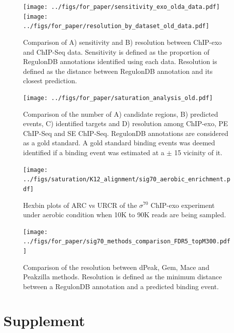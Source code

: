 \documentclass{bmcart}\usepackage[]{graphicx}\usepackage[]{color}
\newcommand{\beginsupplement}{%
        \setcounter{table}{0}
        \renewcommand{\thetable}{S\arabic{table}}%
        \setcounter{figure}{0}
        \renewcommand{\thefigure}{S\arabic{figure}}%
     }
\newcommand{\sig}{\sigma^{70}}
\begin{document}
\newpage
\begin{figure}[h!]
  \centering
  \texttt{[image: ../figs/for\_paper/sensitivity\_exo\_olda\_data.pdf]}
  \texttt{[image: ../figs/for\_paper/resolution\_by\_dataset\_old\_data.pdf]}
  \caption{Comparison of A) sensitivity and B) resolution between
    ChIP-exo and ChIP-Seq data. Sensitivity is defined as the
    proportion of RegulonDB annotations identified using each
    data. Resolution is defined as the distance between RegulonDB
    annotation and its closest prediction.}
  \label{fig:reso_all}
\end{figure}

\newpage

\begin{figure}[h]
  \centering
  \texttt{[image: ../figs/for\_paper/saturation\_analysis\_old.pdf]}
  \caption{Comparison of the number of A) candidate regions, B)
    predicted events, C) identified targets and D) resolution among
    ChIP-exo, PE ChIP-Seq and SE ChIP-Seq. RegulonDB annotations are
    considered as a gold standard. A gold standard binding events was
    deemed identified if a binding event was estimated at a $\pm$
    15 vicinity of it.}
  \label{fig:design}
\end{figure}


 \newpage

\begin{figure}[h!]
  \centering
\texttt{[image: ../figs/saturation/K12\_alignment/sig70\_aerobic\_enrichment.pdf]}
\caption{Hexbin plots of ARC vs URCR of the $\sig$ ChIP-exo experiment
  under aerobic condition when 10K to 90K reads are being sampled.}
  \label{fig:exoQC_sat_aero}
\end{figure}

\newpage

\begin{figure}[h!]
  \centering
  \texttt{[image: ../figs/for\_paper/sig70\_methods\_comparison\_FDR5\_topM300.pdf]}
  \caption{Comparison of the resolution between dPeak, Gem, Mace and
    Peakzilla methods. Resolution is defined as the minimum distance
    between a RegulonDB annotation and a predicted binding event.}
  \label{fig:methods_comp}
\end{figure}

\newpage

\beginsupplement

\section*{Supplement}
\label{sec:supp}
\end{document}
